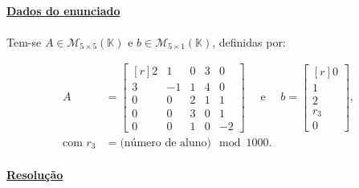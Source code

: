 \grupo{}

\paragraph{\underline{Dados do enunciado}}
\paragraph{} Tem-se $A \in \mathcal{M}_{5 \times 5}(\mathbb{K})$ e
$b \in \mathcal{M}_{5 \times 1}(\mathbb{K})$, definidas por:

\begin{align*}
	A &=
	\begin{bmatrix*}[r]
		2 & 1 & 0 & 3 & 0\\
		3 & -1 & 1 & 4 & 0\\
		0 & 0 & 2 & 1 & 1\\
		0 & 0 & 3 & 0 & 1\\
		0 & 0 & 1 & 0 & -2
	\end{bmatrix*}
	\quad
	\text{ e }
	\quad
	b =
	\begin{bmatrix*}[r]
		0\\
		1\\
		2\\
		r_3\\
		0
	\end{bmatrix*},\\
	\text{com }r_3 &= \text{(número de aluno)} \mod 1000.
\end{align*}

\paragraph{\underline{Resolução}}

